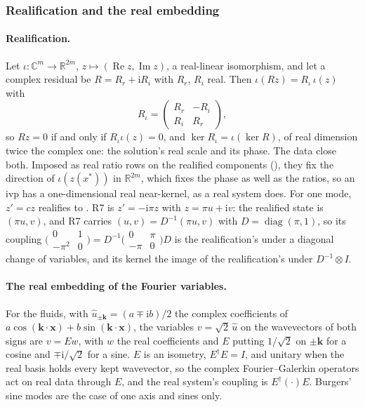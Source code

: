 \subsubsection{Realification and the real embedding}
\label{app:realification}

\paragraph{Realification.} Let $\iota:\mathbb{C}^m\to\mathbb{R}^{2m}$, $z\mapsto(\operatorname{Re}z,\operatorname{Im}z)$, a real-linear isomorphism, and let a complex residual be $R=R_r+\mathrm{i}R_i$ with $R_r$, $R_i$ real. Then $\iota(Rz)=R_\iota\,\iota(z)$ with
\begin{equation}
    R_\iota=\begin{pmatrix}R_r & -R_i\\ R_i & R_r\end{pmatrix},
\end{equation}
so $Rz=0$ if and only if $R_\iota\iota(z)=0$, and $\ker R_\iota=\iota(\ker R)$, of real dimension twice the complex one: the solution's real scale and its phase. The data close both. Imposed as real ratio rows on the realified components (), they fix the direction of $\iota(z(x^*))$ in $\mathbb{R}^{2m}$, which fixes the phase as well as the ratios, so an \gls{ivp} has a one-dimensional real near-kernel, as a real system does. For one mode, $z'=cz$ realifies to . R7 is $z'=-\mathrm{i}\pi z$ with $z=\pi u+\mathrm{i}v$: the realified state is $(\pi u,v)$, and R7 carries $(u,v)=D^{-1}(\pi u,v)$ with $D=\operatorname{diag}(\pi,1)$, so its coupling $\bigl(\begin{smallmatrix}0&1\\-\pi^2&0\end{smallmatrix}\bigr)=D^{-1}\bigl(\begin{smallmatrix}0&\pi\\-\pi&0\end{smallmatrix}\bigr)D$ is the realification's under a diagonal change of variables, and its kernel the image of the realification's under $D^{-1}\otimes I$.

\paragraph{The real embedding of the Fourier variables.} For the fluids, with $\hat u_{\pm\mathbf k}=(a\mp\mathrm{i}b)/2$ the complex coefficients of $a\cos(\mathbf k\cdot\mathbf x)+b\sin(\mathbf k\cdot\mathbf x)$, the variables $v=\sqrt2\,\hat u$ on the wavevectors of both signs are $v=Ew$, with $w$ the real coefficients and $E$ putting $1/\sqrt2$ on $\pm\mathbf k$ for a cosine and $\mp\mathrm{i}/\sqrt2$ for a sine. $E$ is an isometry, $E^\dagger E=I$, and unitary when the real basis holds every kept wavevector, so the complex Fourier--Galerkin operators act on real data through $E$, and the real system's coupling is $E^\dagger(\cdot)E$. Burgers' sine modes are the case of one axis and sines only.

